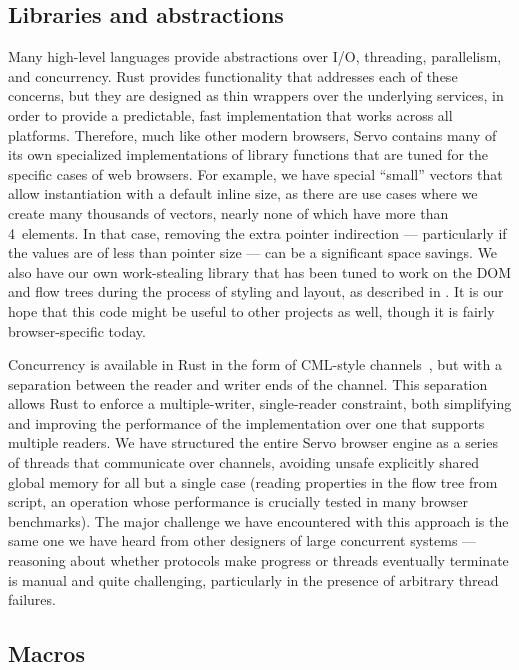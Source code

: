 \subsection{Libraries and abstractions}
Many high-level languages provide abstractions over I/O, threading, parallelism, and concurrency.
Rust provides functionality that addresses each of these concerns, but they are designed as thin
wrappers over the underlying services, in order to provide a predictable, fast implementation
that works across all platforms.
Therefore, much like other modern browsers, Servo contains many of its own specialized implementations of
library functions that are tuned for the specific cases of web browsers.
For example, we have special ``small'' vectors that allow instantiation with a default inline size,
as there are use cases where we create many thousands of vectors, nearly none of which have more than 4~elements.
In that case, removing the extra pointer indirection --- particularly if the values are of less than pointer size ---
can be a significant space savings.
We also have our own work-stealing library that has been tuned to work on the
DOM and flow trees during the process of styling and layout,
as described in .
It is our hope that this code might be useful to other projects as well, though it is fairly browser-specific today.

Concurrency is available in Rust in the form of CML-style channels~\cite{reppy:cml}, but with a separation
between the reader and writer ends of the channel.
This separation allows Rust to enforce a multiple-writer, single-reader constraint, both simplifying and improving
the performance of the implementation over one that supports multiple readers.
We have structured the entire Servo browser engine as a series of threads that communicate over channels,
avoiding unsafe explicitly shared global memory for all but a single case (reading properties in the flow tree
from script, an operation whose performance is crucially tested in many browser benchmarks).
The major challenge we have encountered with this approach is the same one we have heard from other designers
of large concurrent systems --- reasoning about whether protocols make progress or threads eventually terminate
is manual and quite challenging, particularly in the presence of arbitrary thread failures.

\subsection{Macros}

